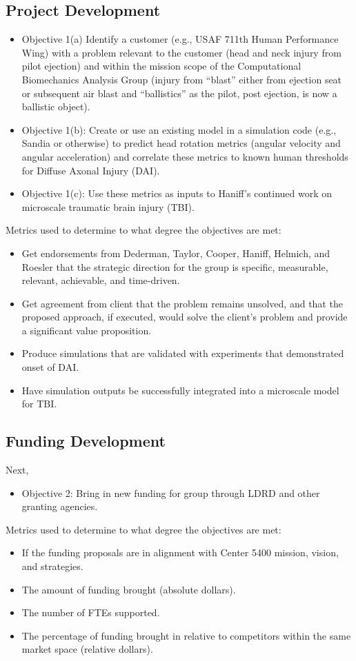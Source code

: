 \documentclass[12pt,reqno]{amsart}
\begin{document}
\subsection{Project Development}
\begin{itemize}
\item Objective 1(a) Identify a customer (e.g., USAF 711th Human Performance
Wing) with a problem relevant to the customer (head and neck injury
from pilot ejection) and within the mission scope of the 
Computational Biomechanics Analysis Group (injury from ``blast'' either
from ejection seat or subsequent air blast and ``ballistics'' as the 
pilot, post ejection, is now a ballistic object).  
\item Objective 1(b): Create or use an existing model in a simulation
code (e.g., Sandia or otherwise) to predict head rotation 
metrics (angular velocity and angular acceleration) and correlate these
metrics to known human thresholds for Diffuse Axonal Injury (DAI).  
\item Objective 1(c): 
Use these metrics as inputs to Haniff's continued work on microscale
traumatic brain injury (TBI).
\end{itemize}
Metrics used to determine to what degree the objectives are met:
\begin{itemize}
\item Get endorsements from Dederman, Taylor, Cooper, Haniff, 
Helmich, and Roesler that the 
strategic direction for the group is specific, measurable, relevant, 
achievable, and time-driven.
\item Get agreement from client that the problem remains unsolved, and that
the proposed approach, if executed, would solve the client's problem and
provide a significant value proposition.
\item Produce simulations that are validated with experiments 
that demonstrated onset of DAI.
\item Have simulation outputs be successfully integrated into a microscale
model for TBI. 
\end{itemize}


\subsection{Funding Development}
Next, 
\begin{itemize}
\item Objective 2: Bring in new funding for group through
LDRD and other granting agencies.
\end{itemize}
Metrics used to determine to what degree the objectives are met:
\begin{itemize}
\item If the funding proposals are in alignment with Center 5400 
mission, vision, and strategies.
\item The amount of funding brought (absolute dollars).
\item The number of FTEs supported.
\item The percentage of funding brought in relative to competitors
within the same market space (relative dollars).
\end{itemize}
\end{document}
